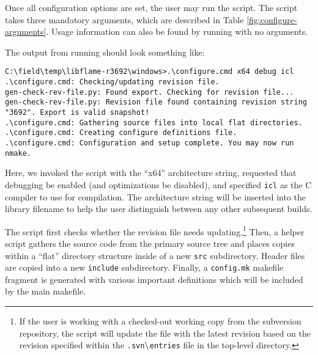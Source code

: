 
Once all configuration options are set, the user may run the \configurecmd
script.
The \configurecmd script takes three mandatory arguments, which are described
in Table \ref{fig:configure-arguments}.
Usage information can also be found by running \configurecmd with no
arguments.

The output from running \configurecmd should look something like:

\begin{Verbatim}[frame=single,framesep=2.5mm,xleftmargin=5mm,fontsize=\footnotesize]
C:\field\temp\libflame-r3692\windows>.\configure.cmd x64 debug icl
.\configure.cmd: Checking/updating revision file.
gen-check-rev-file.py: Found export. Checking for revision file...
gen-check-rev-file.py: Revision file found containing revision string "3692". Export is valid snapshot!
.\configure.cmd: Gathering source files into local flat directories.
.\configure.cmd: Creating configure definitions file.
.\configure.cmd: Configuration and setup complete. You may now run nmake.
\end{Verbatim}

Here, we invoked the \configurecmd script with the ``x64'' architecture
string, requested that debugging be enabled (and optimizations be disabled),
and specified {\tt icl} as the C compiler to use for compilation.
The architecture string will be inserted into the library filename to help
the user distinguish between any other subsequent builds.

The \configurecmd script first checks whether the revision file needs
updating.\footnote{If the user is working with a checked-out working copy from
the  \libflame subversion repository, the script will update the file with the
latest revision based on the revision specified within the
{\tt .svn$\backslash$entries} file in the top-level \windows directory.}
Then, a helper script gathers the source code from the primary source tree and
places copies within a ``flat'' directory structure inside of a new {\tt src}
subdirectory.
Header files are copied into a new {\tt include} subdirectory.
Finally, a {\tt config.mk} makefile fragment is generated with various important
definitions which will be included by the main \nmake makefile.

